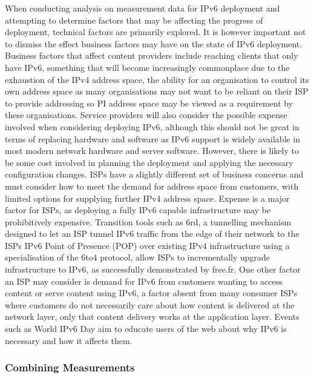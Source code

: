 When conducting analysis on measurement data for IPv6 deployment and attempting
to determine factors that may be affecting the progress of deployment, technical
factors are primarily explored. It is however important not to dismiss the
effect business factors may have on the state of IPv6 deployment. Business
factors that affect content providers include reaching clients that only have
IPv6, something that will become increasingly commonplace due to the exhaustion
of the IPv4 address space, the ability for an organisation to control its own
address space as many organisations may not want to be reliant on their ISP to
provide addressing so PI address space may be viewed as a requirement by these
organisations. Service providers will also consider the possible expense
involved when considering deploying IPv6, although this should not be great in
terms of replacing hardware and software as IPv6 support is widely available in
most modern network hardware and server software. However, there is likely to be
some cost involved in planning the deployment and applying the necessary
configuration changes. ISPs have a slightly different set of business concerns
and must consider how to meet the demand for address space from customers, with
limited options for supplying further IPv4 address space. Expense is a major
factor for ISPs, as deploying a fully IPv6 capable infrastructure may be
prohibitively expensive. Transition tools such as 6rd, a tunnelling mechanism
designed to let an ISP tunnel IPv6 traffic from the edge of their network to the
ISPs IPv6 Point of Presence (POP) over existing IPv4 infrastructure using a
specialisation of the 6to4 protocol, allow ISPs to incrementally upgrade
infrastructure to IPv6, as successfully demonstrated by free.fr. One other
factor an ISP may consider is demand for IPv6 from customers wanting to access
content or serve content using IPv6, a factor absent from many consumer ISPs
where customers do not necessarily care about how content is delivered at the
network layer, only that content delivery works at the application layer. Events
such as World IPv6 Day aim to educate users of the web about why IPv6 is
necessary and how it affects them.

\subsubsection{Combining Measurements}

